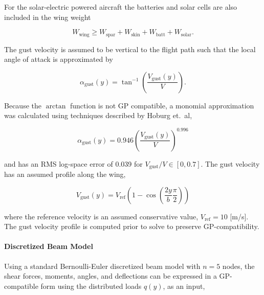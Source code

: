 For the solar-electric powered aircraft the batteries and solar cells are also included in the wing weight

\begin{equation}
    W_{\text{wing}} \geq W_{\text{spar}} + W_{\text{skin}} + W_{\text{batt}} + W_{\text{solar}}.
\end{equation}

The gust velocity is assumed to be vertical to the flight path such that the local angle of attack is approximated by 

\begin{equation}
    \label{e:gustalpha}
    \alpha_{\text{gust}}(y)  = \tan^{-1}\left(\frac{V_{\text{gust}}(y)}{V} \right).
\end{equation}

Because the $\arctan$ function is not GP compatible, a monomial approximation was calculated using techniques described by Hoburg et.~al\cite{fitting},

\begin{equation}
    \alpha_{\text{gust}}(y)  = 0.946 \left(\frac{V_{\text{gust}}(y)}{V} \right)^{0.996}
\end{equation}

and has an RMS log-space error of 0.039 for $V_{\text{gust}}/V \in [0, 0.7]$.
The gust velocity has an assumed profile along the wing\cite{acgust},

\begin{equation}
    \label{e:gustwind}
    V_{\text{gust}}(y) = V_{\text{ref}} \left(1-\cos\left(\frac{2y}{b} \frac{\pi}{2} \right) \right)
\end{equation}

where the reference velocity is an assumed conservative value\cite{acgust}, $V_{\text{ref}} = 10$ [m/s]. The gust velocity profile is computed prior to solve to preserve GP-compatibility.

\paragraph{\textbf{Discretized Beam Model}} 

Using a standard Bernoulli-Euler discretized beam model with $n=5$ nodes\cite{bending}, the shear forces, moments, angles, and deflections can be expressed in a GP-compatible form using the distributed loads $q(y)$, as an input,

